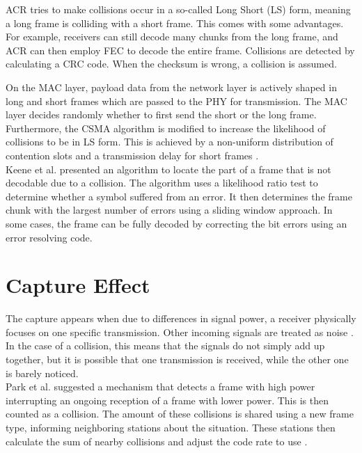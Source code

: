 \gls{ACR} \cite{wu2010} tries to make collisions occur in a so-called Long Short (LS) form, meaning a long frame is colliding with a short frame. This comes with some advantages. For example, receivers can still decode many chunks from the long frame, and \gls{ACR} can then employ \gls{FEC} to decode the entire frame. Collisions are detected by calculating a \gls{CRC} code. When the checksum is wrong, a collision is assumed.

On the \gls{MAC} layer, payload data from the network layer is actively shaped in long and short frames which are passed to the \gls{PHY} for transmission. The \gls{MAC} layer decides randomly whether to first send the short or the long frame. Furthermore, the \gls{CSMA} algorithm is modified to increase the likelihood of collisions to be in LS form. This is achieved by a non-uniform distribution of contention slots and a transmission delay for short frames \cite{wu2010}.\\

Keene et al. \cite{keene2010} presented an algorithm to locate the part of a frame that is not decodable due to a collision. The algorithm uses a likelihood ratio test to determine whether a symbol suffered from an error. It then determines the frame chunk with the largest number of errors using a sliding window approach. In some cases, the frame can be fully decoded by correcting the bit errors using an error resolving code.



\section{Capture Effect}\label{sec:related-capture}

The capture appears when due to differences in signal power, a receiver physically focuses on one specific transmission. Other incoming signals are treated as noise \cite{kim1999}. In the case of a collision, this means that the signals do not simply add up together, but it is possible that one transmission is received, while the other one is barely noticed.\\

Park et al. suggested a mechanism that detects a frame with high power interrupting an ongoing reception of a frame with lower power. This is then counted as a collision. The amount of these collisions is shared using a new frame type, informing neighboring stations about the situation. These stations then calculate the sum of nearby collisions and adjust the code rate to use \cite{park2009}.\\

